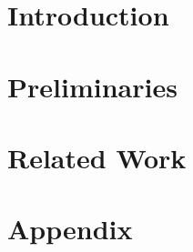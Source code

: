 
\addtolength{\evensidemargin}{-12mm}

%
%
\part[Introduction]{Introduction}
\label{part:introAndBackgroundTheory}


\part[Preliminaries]{Preliminaries}
\label{part:preliminaries}


\part[Related Work]{Related Work}
\label{part:relatedWork}



%
% 
%
% 
% 

% 
% 
% 


%
%

\part*{Appendix}

\appendix %

%
